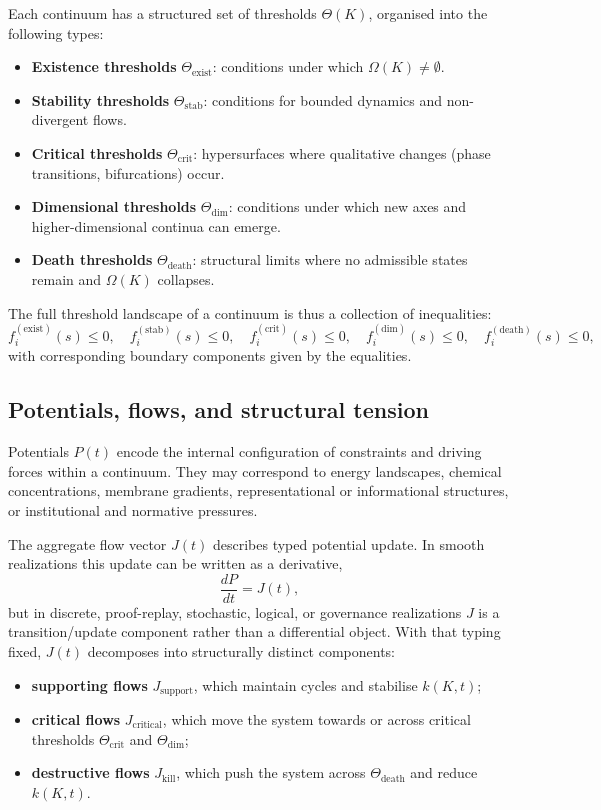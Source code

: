 Each continuum has a structured set of thresholds \(\Theta(K)\), organised into the following types:

\begin{itemize}
    \item \textbf{Existence thresholds} \(\Theta_{\mathrm{exist}}\): conditions under which \(\Omega(K)\neq\emptyset\).
    \item \textbf{Stability thresholds} \(\Theta_{\mathrm{stab}}\): conditions for bounded dynamics and non-divergent flows.
    \item \textbf{Critical thresholds} \(\Theta_{\mathrm{crit}}\): hypersurfaces where qualitative changes (phase transitions, bifurcations) occur.
    \item \textbf{Dimensional thresholds} \(\Theta_{\mathrm{dim}}\): conditions under which new axes and higher-dimensional continua can emerge.
    \item \textbf{Death thresholds} \(\Theta_{\mathrm{death}}\): structural limits where no admissible states remain and \(\Omega(K)\) collapses.
\end{itemize}

The full threshold landscape of a continuum is thus a collection of inequalities:
\[
    f_{i}^{(\mathrm{exist})}(s) \le 0,\quad
    f_{i}^{(\mathrm{stab})}(s) \le 0,\quad
    f_{i}^{(\mathrm{crit})}(s) \le 0,\quad
    f_{i}^{(\mathrm{dim})}(s) \le 0,\quad
    f_{i}^{(\mathrm{death})}(s) \le 0,
\]
with corresponding boundary components given by the equalities.

\subsection{Potentials, flows, and structural tension}

Potentials \(P(t)\) encode the internal configuration of constraints and driving forces within a continuum.
They may correspond to energy landscapes, chemical concentrations, membrane gradients, representational or informational structures, or institutional and normative pressures.

The aggregate flow vector \(J(t)\) describes typed potential update. In smooth
realizations this update can be written as a derivative,
\[
    \frac{dP}{dt} = J(t),
\]
but in discrete, proof-replay, stochastic, logical, or governance realizations
\(J\) is a transition/update component rather than a differential object. With
that typing fixed, \(J(t)\) decomposes into structurally distinct components:
\begin{itemize}
    \item \textbf{supporting flows} \(J_{\mathrm{support}}\), which maintain cycles and stabilise \(k(K,t)\);
    \item \textbf{critical flows} \(J_{\mathrm{critical}}\), which move the system towards or across critical thresholds \(\Theta_{\mathrm{crit}}\) and \(\Theta_{\mathrm{dim}}\);
    \item \textbf{destructive flows} \(J_{\mathrm{kill}}\), which push the system across \(\Theta_{\mathrm{death}}\) and reduce \(k(K,t)\).
\end{itemize}

